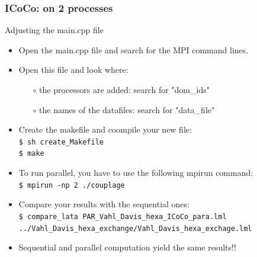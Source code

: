 \documentclass[10pt, hyperref={unicode=true,pdfusetitle, bookmarks=true,bookmarksnumbered=false,bookmarksopen=false, breaklinks=false,pdfborder={0 0 1},backref=true,colorlinks=true,linkcolor=darkblue,pageanchor, urlcolor=darkblue}]{beamer}
\begin{document}
\begin{frame}
\frametitle{ICoCo: on 2 processes}
\begin{block}{Adjusting the main.cpp file}

\begin{itemize}
\item Open the main.cpp file and search for the MPI command lines.
\item Open this file and look where:
    \begin{itemize}
    \item [$\circ$] the processors are added: search for "dom\_ids"
    \item [$\circ$] the names of the datafiles: search for "data\_file"
    \end{itemize}

\item Create the makefile and coompile your new file:\\
\texttt{\$ sh create\_Makefile}\\
\texttt{\$ make}\\
\item To run parallel, you have to use the following mpirun command:\\
\texttt{\$ mpirun -np 2 ./couplage}\\

\item Compare your results with the sequential ones:\\
\texttt{\$ compare\_lata PAR\_Vahl\_Davis\_hexa\_ICoCo\_para.lml ../Vahl\_Davis\_hexa\_exchange/Vahl\_Davis\_hexa\_exchage.lml}\\
\item Sequential and parallel computation yield the same results!!
\end{itemize}

\end{block}
\end{frame}
\end{document}
